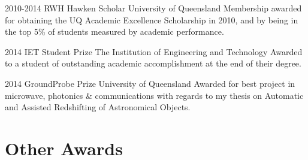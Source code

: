\documentclass[]{friggeri-cv} %
\begin{document}
\begin{entrylist}
\entry
{2010-2014}
{RWH Hawken Scholar}
{University of Queensland}
{Membership awarded for obtaining the UQ Academic Excellence Scholarship in 2010, and by being in the top 5\% of students measured by academic performance.}
\end{entrylist}
\begin{entrylist}
\entry
{2014}
{IET Student Prize}
{The Institution of Engineering and Technology}
{Awarded to a student of outstanding academic accomplishment at the end of their degree.}
\end{entrylist}
\begin{entrylist}
\entry
{2014}
{GroundProbe Prize}
{University of Queensland}
{Awarded for best project in microwave, photonics \& communications with regards to my thesis on Automatic and Assisted Redshifting of Astronomical Objects.}
\end{entrylist}


\section{Other Awards}
\end{document}

